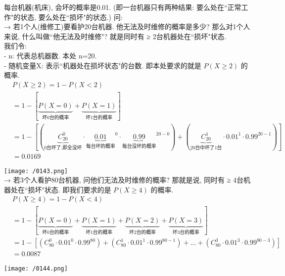 \documentclass[UTF8]{ctexart}
\begin{document}
\begin{myEnvSample}
	每台机器(机床), 会坏的概率是0.01. (即一台机器只有两种结果: 要么处在``正常工作"的状态, 要么处在``损坏"的状态.) 问: \\
	
	→ 若1个人(维修工)要看护20台机器. 他无法及时维修的概率是多少? 那么对1个人来说, 什么叫做``他无法及时维修"? 就是同时有 ≥ 2台机器处在``损坏"状态. \\
	我们令: \\
	- n: 代表总机器数. 本处 n=20. \\
	- 随机变量X: 表示``机器处在损坏状态"的台数. 即本处要求的就是 $P(X \geq 2)$ 的概率. 	
	\begin{align*}  %
	&P\left( X\ge 2 \right) =1-P\left( X<2 \right)\\
&=1-\left[ \underset{\text{坏0台的概率}}{\underbrace{P\left( X=0 \right) }}+\underset{\text{坏1台的概率}}{\underbrace{P\left( X=1 \right) }} \right]\\
&=1-\left[ \left( \underset{0\text{台坏了,即全没坏}}{\underbrace{C_{20}^{0}}}\cdot \underset{\text{每台坏的概率}}{\underbrace{0.01}}^0\cdot \underset{\text{每台没坏的概率}}{\underbrace{0.99}}^{20-0} \right) +\left( \underset{20\text{台中坏了1台}}{\underbrace{C_{20}^{1}}}\cdot 0.01^1\cdot 0.99^{20-1} \right) \right]\\
&=0.0169
	\end{align*} 

\texttt{[image: /0143.png]} \\


→ 若3个人看护80台机器, 问他们无法及时维修的概率?  那就是说, 同时有 ≥ 4台机器处在``损坏"状态. 即我们要求的是  $P(X \geq 4)$ 的概率. 
\begin{align*}  %
	&P\left( X\ge 4 \right) =1-P\left( X<4 \right)\\
&=1-\left[ \underset{\text{坏0台的概率}}{\underbrace{P\left( X=0 \right) }}+\underset{\text{坏1台的概率}}{\underbrace{P\left( X=1 \right) }}+\underset{\text{坏2台的概率}}{\underbrace{P\left( X=2 \right) }}+\underset{\text{坏3台的概率}}{\underbrace{P\left( X=3 \right) }} \right]\\
&=1-\left[ \left( C_{80}^{0}\cdot 0.01^0\cdot 0.99^{80} \right) +\left( C_{80}^{1}\cdot 0.01^1\cdot 0.99^{80-1} \right) +...+\left( C_{80}^{3}\cdot 0.01^3\cdot 0.99^{80-3} \right) \right]\\
&=0.0087
\end{align*}

\texttt{[image: /0144.png]} 
\end{myEnvSample}
\vspace{1em} 
\end{document}
